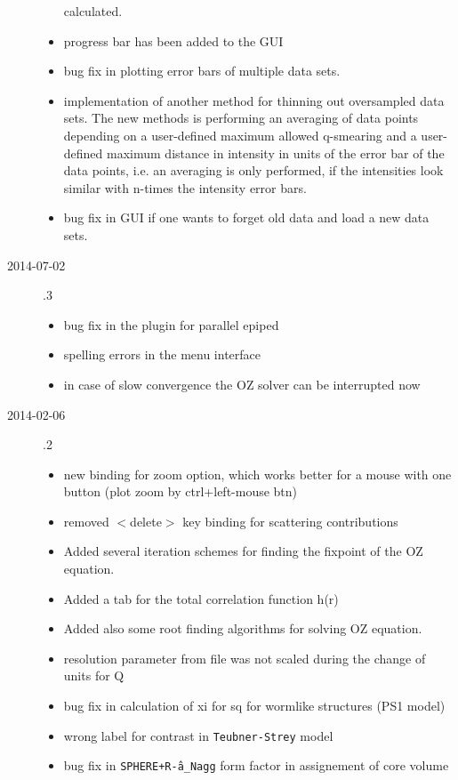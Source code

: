 \begin{description}
\begin{itemize}
        calculated.
    \item progress bar has been added to the GUI
    \item bug fix in plotting error bars of multiple data sets.
    \item implementation of another method for thinning out oversampled data sets. The
        new methods is performing an averaging of data points depending on a
        user-defined maximum allowed q-smearing and a user-defined maximum distance
        in intensity in units of the error bar of the data points, i.e. an averaging is
        only performed, if the intensities look similar with n-times the intensity
        error bars.
    \item bug fix in GUI if one wants to forget old data and load a new data sets.
    \end{itemize}
    \item[2014-07-02] .3
    \begin{itemize}
        \item bug fix in the plugin for parallel epiped
        \item spelling errors in the menu interface
        \item in case of slow convergence the OZ solver can be interrupted now
    \end{itemize}
    \item[2014-02-06] .2
    \begin{itemize}
        \item new binding for zoom option, which works better for a mouse with one button
              (plot zoom by ctrl+left-mouse btn)
        \item removed $<$delete$>$ key binding for scattering contributions
        \item Added several iteration schemes for finding the fixpoint of the OZ equation.
        \item Added a tab for the total correlation function h(r)
        \item Added also some root finding algorithms for solving OZ equation.
        \item resolution parameter from file was not scaled during the change of units for Q
        \item bug fix in calculation of xi for sq for wormlike structures  (PS1 model)
        \item wrong label for contrast in \texttt{Teubner-Strey} model
        \item bug fix in \texttt{SPHERE+R\^-a\_Nagg} form factor in assignement of core volume

\end{itemize}
\end{description}

